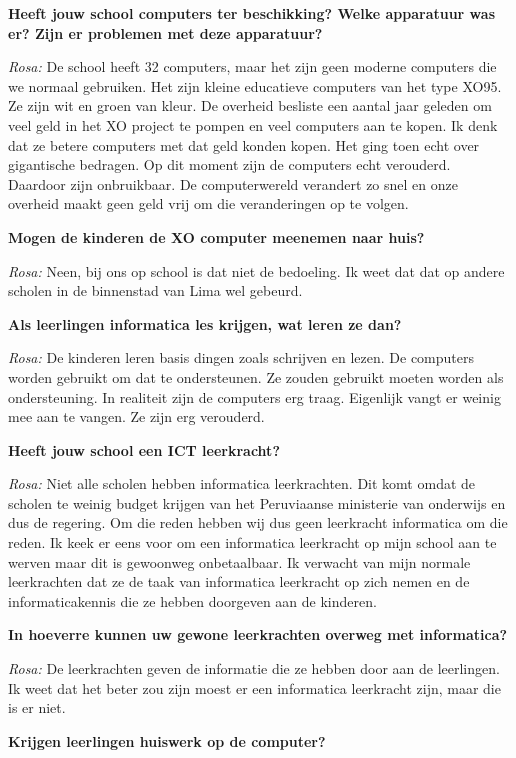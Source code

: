 \textbf{Heeft jouw school computers ter beschikking? Welke apparatuur was er? Zijn er problemen met deze apparatuur?}

\textit{Rosa:} De school heeft 32 computers, maar het zijn geen moderne computers die we normaal gebruiken. Het zijn kleine educatieve computers van het type XO95. Ze zijn wit en groen van kleur. De overheid besliste een aantal jaar geleden om veel geld in het XO project te pompen en veel computers aan te kopen. Ik denk dat ze betere computers met dat geld konden kopen. Het ging toen echt over gigantische bedragen. Op dit moment zijn de computers echt verouderd. Daardoor zijn onbruikbaar. De computerwereld verandert zo snel en onze overheid maakt geen geld vrij om die veranderingen op te volgen.

\textbf{Mogen de kinderen de XO computer meenemen naar huis?}

\textit{Rosa:} Neen, bij ons op school is dat niet de bedoeling. Ik weet dat dat op andere scholen in de binnenstad van Lima wel gebeurd.

\textbf{Als leerlingen informatica les krijgen, wat leren ze dan?}

\textit{Rosa:} De kinderen leren basis dingen zoals schrijven en lezen. De computers worden gebruikt om dat te ondersteunen. Ze zouden gebruikt moeten worden als ondersteuning. In realiteit zijn de computers erg traag. Eigenlijk vangt er weinig mee aan te vangen. Ze zijn erg verouderd.

\textbf{Heeft jouw school een ICT leerkracht?}

\textit{Rosa:} Niet alle scholen hebben informatica leerkrachten. Dit komt omdat de scholen te weinig budget krijgen van het Peruviaanse ministerie van onderwijs en dus de regering. Om die reden hebben wij dus geen leerkracht informatica om die reden. Ik keek er eens voor om een informatica leerkracht op mijn school aan te werven maar dit is gewoonweg onbetaalbaar. Ik verwacht van mijn normale leerkrachten dat ze de taak van informatica leerkracht op zich nemen en de informaticakennis die ze hebben doorgeven aan de kinderen.

\textbf{In hoeverre kunnen uw gewone leerkrachten overweg met informatica?}

\textit{Rosa:} De leerkrachten geven de informatie die ze hebben door aan de leerlingen. Ik weet dat het beter zou zijn moest er een informatica leerkracht zijn, maar die is er niet.

\textbf{Krijgen leerlingen huiswerk op de computer?}

